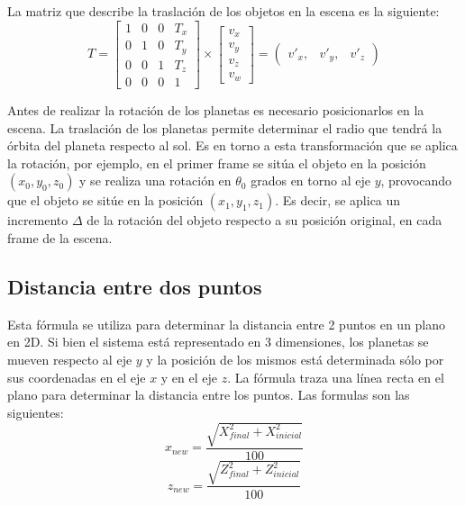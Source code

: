 \documentclass[journal]{IEEEtran}
\begin{document}
La matriz que describe la traslación de los objetos en la escena es la siguiente:\\

\[ 
	T = \left[ 
			\begin{array}{cccc}
				1 & 0 & 0 & T_{x} \\
				0 & 1 & 0 & T_{y} \\
				0 & 0 & 1 & T_{z} \\
				0 & 0 & 0 & 1 
			\end{array}
		\right] \times 
		\left[ 
			\begin{array}{c}
				v_{x} \\
				v_{y} \\
				v_{z} \\
				v_{w} 
			\end{array}
		\right] = 
		\left(
			\begin{array}{ccc}
				v'_{x} , & v'_{y} , & v'_{z}
			\end{array}
		\right)
\]
\newline

Antes de realizar la rotación de los planetas es necesario posicionarlos en la escena. La traslación de los planetas permite determinar el radio que tendrá la órbita del planeta respecto al sol. Es en torno a esta transformación que se aplica la rotación, por ejemplo, en el primer frame se sitúa el objeto en la posición $(x_{0}, y_{0}, z_{0})$ y se realiza una rotación en $\theta_{0}$ grados en torno al eje $y$, provocando que el objeto se sitúe en la posición $(x_{1}, y_{1}, z_{1})$. Es decir, se aplica un incremento $\Delta$ de la rotación del objeto respecto a su posición original, en cada frame de la escena.

\subsection{Distancia entre dos puntos}

Esta fórmula se utiliza para determinar la distancia entre 2 puntos en un plano en 2D. Si bien el sistema está representado en 3 dimensiones, los planetas se mueven respecto al eje $y$ y la posición de los mismos está determinada sólo por sus coordenadas en el eje $x$ y en el eje $z$. La fórmula traza una línea recta en el plano para determinar la distancia entre los puntos. Las formulas son las siguientes:\\

\[ 
	x_{new} = \frac{\sqrt{X_{final}^{2}+X_{inicial}^{2}}}{100} 
\]
\newline
\[
	z_{new} = \frac{\sqrt{Z_{final}^{2}+Z_{inicial}^{2}}}{100}
\]
\newline
\end{document}
